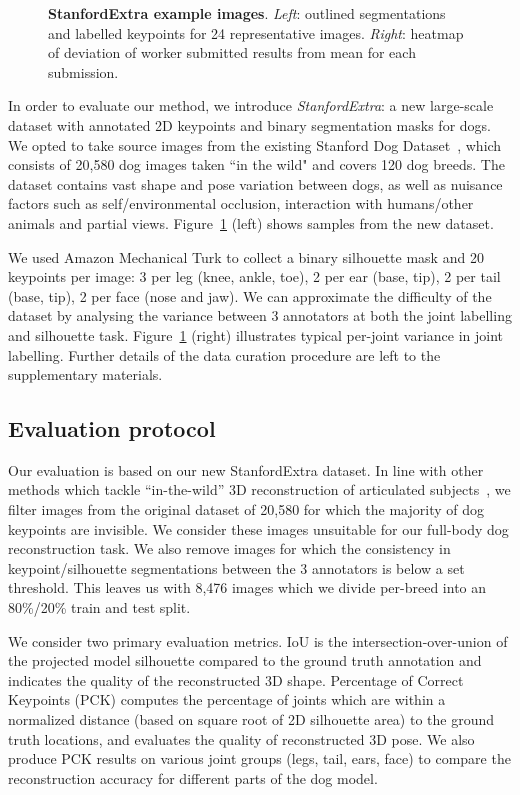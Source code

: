 \begin{figure}[h]
    \caption{\textbf{StanfordExtra example images}. \emph{Left}: outlined segmentations and labelled keypoints for 24 representative images. \emph{Right}: heatmap of deviation of worker submitted results from mean for each submission.}
    \label{fig:dataset}
\end{figure}

In order to evaluate our method, we introduce \emph{StanfordExtra}: a new large-scale dataset with annotated 2D keypoints and binary segmentation masks for dogs. We opted to take source images from the existing Stanford Dog Dataset~\cite{StanfordDogs}, which consists of 20,580 dog images taken ``in the wild" and covers 120 dog breeds. The dataset contains vast shape and pose variation between dogs, as well as nuisance factors such as self/environmental occlusion, interaction with humans/other animals and partial views. Figure~\ref{fig:dataset} (left) shows samples from the new dataset.

We used Amazon Mechanical Turk to collect a binary silhouette mask and 20 keypoints per image: 3 per leg (knee, ankle, toe), 2 per ear (base, tip), 2 per tail (base, tip), 2 per face (nose and jaw). We can approximate the difficulty of the dataset by analysing the variance between 3 annotators at both the joint labelling and silhouette task. Figure~\ref{fig:dataset} (right) illustrates typical per-joint variance in joint labelling. Further details of the data curation procedure are left to the supplementary materials. 

\subsection{Evaluation protocol}

Our evaluation is based on our new StanfordExtra dataset. In line with other methods which tackle ``in-the-wild'' 3D reconstruction of articulated subjects~\cite{kolotouros19learning,kolotouros19convolutional}, we filter images from the original dataset of 20,580 for which the majority of dog keypoints are invisible. We consider these images unsuitable for our full-body dog reconstruction task. We also remove images for which the consistency in keypoint/silhouette segmentations between the 3 annotators is below a set threshold. This leaves us with 8,476 images which we divide per-breed into an 80\%/20\% train and test split.

We consider two primary evaluation metrics. IoU is the intersection-over-union of the projected model silhouette compared to the ground truth annotation and indicates the quality of the reconstructed 3D shape. Percentage of Correct Keypoints (PCK) computes the percentage of joints which are within a normalized distance (based on square root of 2D silhouette area) to the ground truth locations, and evaluates the quality of reconstructed 3D pose. We also produce PCK results on various joint groups (legs, tail, ears, face) to compare the reconstruction accuracy for different parts of the dog model.

